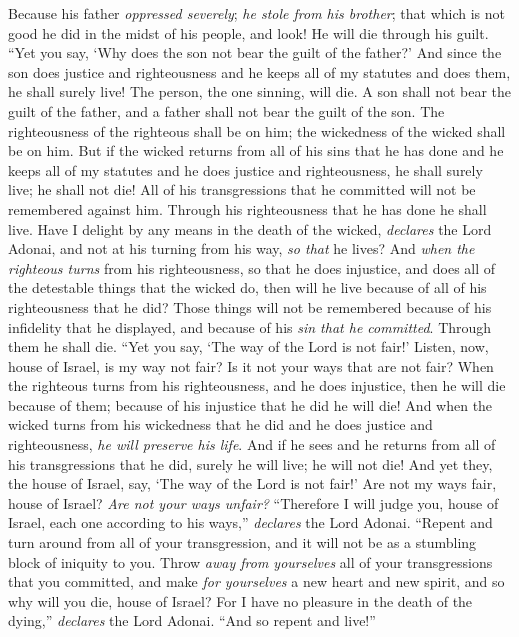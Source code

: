 \begin{biblechapter}
\verse Because his father \textit{oppressed severely}; \textit{he stole from his brother}; that which is not good he did in the midst of his people, and look! He will die through his guilt.
\verse “Yet you say, ‘Why does the son not bear the guilt of the father?’ And since the son does justice and righteousness and he keeps all of my statutes and does them, he shall surely live!
\verse The person, the one sinning, will die. A son shall not bear the guilt of the father, and a father shall not bear the guilt of the son. The righteousness of the righteous shall be on him; the wickedness of the wicked shall be on him.
\verse But if the wicked returns from all of his sins that he has done and he keeps all of my statutes and he does justice and righteousness, he shall surely live; he shall not die!
\verse All of his transgressions that he committed will not be remembered against him. Through his righteousness that he has done he shall live.
\verse Have I delight by any means in the death of the wicked, \textit{declares} the Lord Adonai, and not at his turning from his way, \textit{so that} he lives?
\verse And \textit{when the righteous turns} from his righteousness, so that he does injustice, and does all of the detestable things that the wicked do, then will he live because of all of his righteousness that he did? Those things will not be remembered because of his infidelity that he displayed, and because of his \textit{sin that he committed}. Through them he shall die.
\verse “Yet you say, ‘The way of the Lord is not fair!’ Listen, now, house of Israel, is my way not fair? Is it not your ways that are not fair?
\verse When the righteous turns from his righteousness, and he does injustice, then he will die because of them; because of his injustice that he did he will die!
\verse And when the wicked turns from his wickedness that he did and he does justice and righteousness, \textit{he will preserve his life}.
\verse And if he sees and he returns from all of his transgressions that he did, surely he will live; he will not die!
\verse And yet they, the house of Israel, say, ‘The way of the Lord is not fair!’ Are not my ways fair, house of Israel? \textit{Are not your ways unfair?}
\verse “Therefore I will judge you, house of Israel, each one according to his ways,” \textit{declares} the Lord Adonai. “Repent and turn around from all of your transgression, and it will not be as a stumbling block of iniquity to you.
\verse Throw \textit{away from yourselves} all of your transgressions that you committed, and make \textit{for yourselves} a new heart and new spirit, and so why will you die, house of Israel?
\verse For I have no pleasure in the death of the dying,” \textit{declares} the Lord Adonai. “And so repent and live!”
\end{biblechapter}

